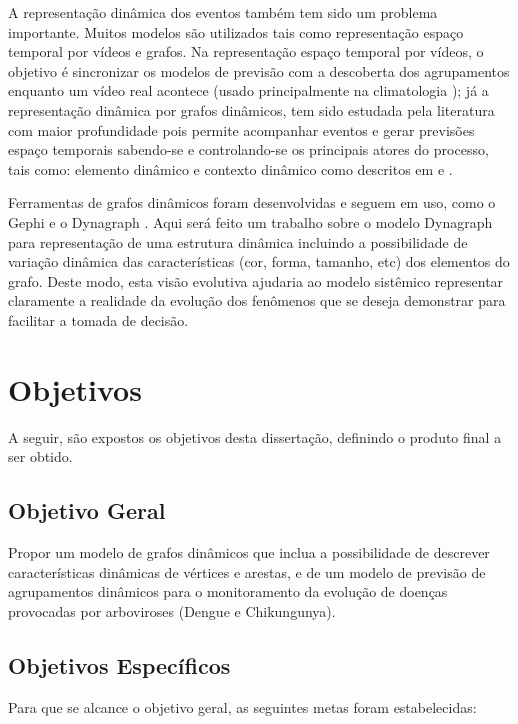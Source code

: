 A representação dinâmica dos eventos também tem sido um problema importante. Muitos modelos são utilizados tais como representação espaço temporal por vídeos e grafos. Na representação espaço temporal por vídeos, o objetivo é sincronizar os modelos de previsão com a descoberta dos agrupamentos enquanto um vídeo real acontece (usado principalmente na climatologia  \cite{faghmous2013}); já a representação dinâmica por grafos dinâmicos, tem sido estudada pela literatura com maior profundidade pois permite acompanhar eventos e gerar previsões espaço temporais sabendo-se e controlando-se os principais atores do processo, tais como: elemento dinâmico e contexto dinâmico como descritos em \cite{holme:predictability} e \cite{Mitsa:2010}.

Ferramentas de grafos dinâmicos foram desenvolvidas e seguem em uso, como o Gephi e o Dynagraph \cite{dynagraph}. Aqui será feito um trabalho sobre o modelo Dynagraph para representação de uma estrutura dinâmica incluindo a possibilidade de variação dinâmica das características (cor, forma, tamanho, etc) dos elementos do grafo. Deste modo, esta visão evolutiva ajudaria ao modelo sistêmico representar claramente a realidade da evolução dos fenômenos que se deseja demonstrar para facilitar a tomada de decisão.

\section{Objetivos}
\label{sec:objetivos}
A seguir, são expostos os objetivos desta dissertação, definindo o produto
final a ser obtido.

\subsection{Objetivo Geral}

Propor um modelo de grafos dinâmicos que inclua a possibilidade de descrever características dinâmicas de vértices e arestas, e de um modelo de previsão de agrupamentos dinâmicos para o monitoramento da evolução de doenças provocadas por arboviroses (Dengue e Chikungunya).

\subsection{Objetivos Específicos}
\label{sec:objetivos-especificos}

Para que se alcance o objetivo geral, as seguintes metas foram estabelecidas:

